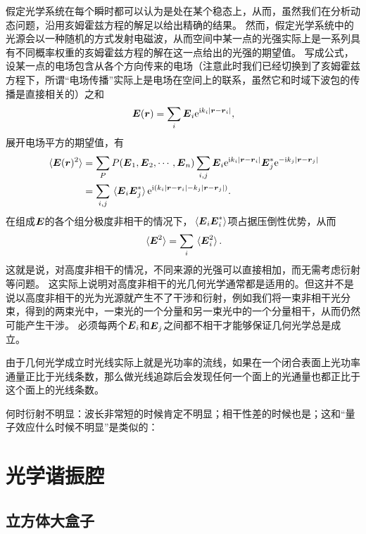 假定光学系统在每个瞬时都可以认为是处在某个稳态上，从而，虽然我们在分析动态问题，沿用亥姆霍兹方程的解足以给出精确的结果。
然而，假定光学系统中的光源会以一种随机的方式发射电磁波，从而空间中某一点的光强实际上是一系列具有不同概率权重的亥姆霍兹方程的解在这一点给出的光强的期望值。
写成公式，设某一点的电场包含从各个方向传来的电场（注意此时我们已经切换到了亥姆霍兹方程下，所谓“电场传播”实际上是电场在空间上的联系，虽然它和时域下波包的传播是直接相关的）之和
\begin{equation}
    \vb*{E}(\vb*{r}) = \sum_i \vb*{E}_i \mathrm{e}^{\mathrm{i} k_i \abs*{\vb*{r} - \vb*{r}_i}},
\end{equation}
展开电场平方的期望值，有
\begin{equation}
    \begin{aligned}
        \expval*{\vb*{E}(\vb*{r})^2} &= \sum_P P(\vb*{E}_1, \vb*{E}_2, \cdots, \vb*{E}_n) \sum_{i, j} \vb*{E}_i \mathrm{e}^{\mathrm{i} k_i \abs*{\vb*{r} - \vb*{r}_i}} \vb*{E}_j^* \mathrm{e}^{- \mathrm{i} k_j \abs*{\vb*{r} - \vb*{r}_j}}  \\
        &= \sum_{i, j} \expval*{\vb*{E}_i \vb*{E}_j^*} \mathrm{e}^{\mathrm{i} (k_i \abs*{\vb*{r} - \vb*{r}_i} - k_j \abs*{\vb*{r} - \vb*{r}_j})}.
    \end{aligned}
\end{equation}
在组成$\vb*{E}$的各个组分极度非相干的情况下，$\expval*{\vb*{E}_i \vb*{E}_i^*}$项占据压倒性优势，从而
\begin{equation}
    \expval*{\vb*{E}^2} = \sum_i \expval*{\vb*{E}_i^2}.
\end{equation}
这就是说，对高度非相干的情况，不同来源的光强可以直接相加，而无需考虑衍射等问题。
这实际上说明对高度非相干的光几何光学通常都是适用的。但这并不是说以高度非相干的光为光源就产生不了干涉和衍射，例如我们将一束非相干光分束，得到的两束光中，一束光的一个分量和另一束光中的一个分量相干，从而仍然可能产生干涉。
必须每两个$\vb*{E}_i$和$\vb*{E}_j$之间都不相干才能够保证几何光学总是成立。

由于几何光学成立时光线实际上就是光功率的流线，如果在一个闭合表面上光功率通量正比于光线条数，那么做光线追踪后会发现任何一个面上的光通量也都正比于这个面上的光线条数。

何时衍射不明显：波长非常短的时候肯定不明显；相干性差的时候也是；这和“量子效应什么时候不明显”是类似的：

\section{光学谐振腔}

\subsection{立方体大盒子}

